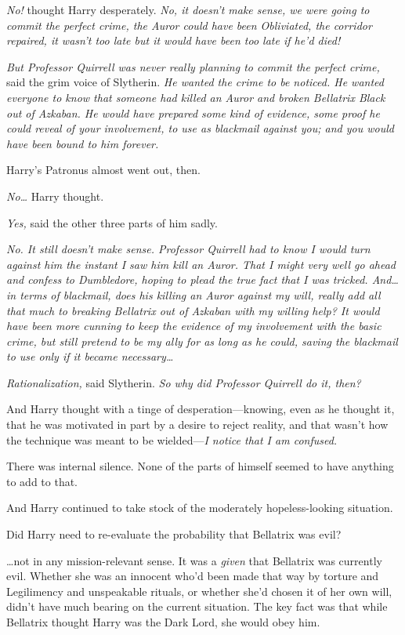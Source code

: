 \emph{No!} thought Harry desperately. \emph{No, it doesn’t make sense, we were going to commit the perfect crime, the Auror could have been Obliviated, the corridor repaired, it wasn’t too late but it \emph{would} have been too late if he’d died!}

\emph{But Professor Quirrell was never really planning to commit the perfect crime,} said the grim voice of Slytherin. \emph{He \emph{wanted} the crime to be noticed. He wanted everyone to know that someone had killed an Auror and broken Bellatrix Black out of Azkaban. He would have prepared some kind of evidence, some proof he could reveal of your involvement, to use as blackmail against you; and you would have been bound to him forever.}

Harry’s Patronus almost went out, then.

\emph{No…} Harry thought.

\emph{Yes,} said the other three parts of him sadly.

\emph{No. It still doesn’t make sense. Professor Quirrell had to know I would turn against him the instant I saw him kill an Auror. That I might very well go ahead and confess to Dumbledore, hoping to plead the true fact that I was tricked. And…in terms of blackmail, does his killing an Auror against my will, really add all \emph{that} much to breaking Bellatrix out of Azkaban with my willing help? It would have been more cunning to keep the evidence of my involvement with the basic crime, but still pretend to be my ally for as long as he could, saving the blackmail to use only if it became necessary…}

\emph{Rationalization,} said Slytherin. \emph{So why \emph{did} Professor Quirrell do it, then?}

And Harry thought with a tinge of desperation—knowing, even as he thought it, that he was motivated in part by a desire to reject reality, and that wasn’t how the technique was meant to be wielded—\emph{I notice that I am confused.}

There was internal silence. None of the parts of himself seemed to have anything to add to that.

And Harry continued to take stock of the moderately hopeless-looking situation.

Did Harry need to re-evaluate the probability that Bellatrix was evil?

…not in any mission-relevant sense. It was a \emph{given} that Bellatrix was currently evil. Whether she was an innocent who’d been made that way by torture and Legilimency and unspeakable rituals, or whether she’d chosen it of her own will, didn’t have much bearing on the current situation. The key fact was that while Bellatrix thought Harry was the Dark Lord, she would obey him.

